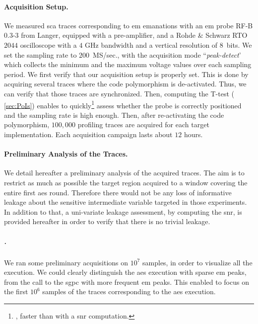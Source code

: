 \paragraph{Acquisition Setup.}
\label{sec:setup}
We measured \gls{sca} traces corresponding to \gls{em} emanations with an \gls{em} probe \textsf{RF-B 0.3-3} from Langer, equipped with a pre-amplifier, and a \textsf{Rohde \& Schwarz RTO} \(2044\) oscilloscope with a \(4\) GHz bandwidth and a vertical resolution of \(8\)~bits.
We set the sampling rate to \(200\)~MS/sec., with the acquisition mode ``\emph{peak-detect}' which collects the minimum and the maximum voltage values over each sampling period.
We first verify that our acquisition setup is properly set.
This is done by acquiring several traces where the code polymorphism is de-activated.
Thus, we can verify that those traces are synchronized.
Then, computing the T-test (\cf{} \autoref{sec:PoIs}) enables to quickly\footnote{\ie{}, faster than with a \gls{snr} computation.} assess whether the probe is correctly positioned and the sampling rate is high enough.
Then, after re-activating the code polymorphism, \(100,000\) profiling traces are acquired for each target implementation.
Each acquisition campaign lasts about \(12\) hours.

\paragraph{Preliminary Analysis of the Traces.}
\label{sec:visual_inspect}
We detail hereafter a preliminary analysis of the acquired traces.
The aim is to restrict as much as possible the target region acquired to a window covering the entire first \gls{aes} round.
Therefore there would not be any loss of informative leakage about the sensitive intermediate variable targeted in those experiments.
In addition to that, a uni-variate leakage assessment, by computing the \gls{snr}, is provided hereafter in order to verify that there is no trivial leakage.

\subparagraph{\mbedTLS{}.}
We ran some preliminary acquisitions on \(10^7\) samples, in order to visualize all the execution.
We could clearly distinguish the \gls{aes} execution with sparse \gls{em} peaks, from the call to the \gls{sgpc} with more frequent \gls{em} peaks.
This enabled to focus on the first \(10^6\) samples of the traces corresponding to the \gls{aes} execution.

